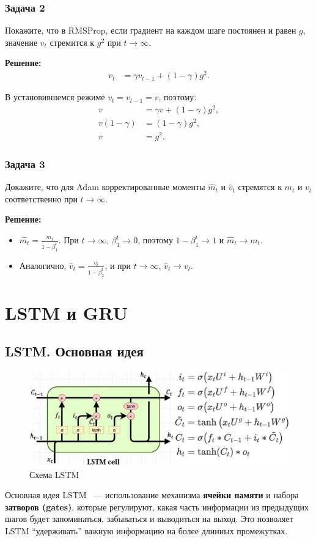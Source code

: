 \subsubsection*{Задача 2}
Покажите, что в RMSProp, если градиент на каждом шаге постоянен и равен $g$, значение $v_t$ стремится к $g^2$ при $t \to \infty$.

\textbf{Решение:}
\begin{align*}
    v_t &= \gamma v_{t-1} + (1 - \gamma) g^2.
\end{align*}

В установившемся режиме $v_t = v_{t-1} = v$, поэтому:
\begin{align*}
    v &= \gamma v + (1 - \gamma) g^2, \\
    v (1 - \gamma) &= (1 - \gamma) g^2, \\
    v &= g^2.
\end{align*}

\subsubsection*{Задача 3}
Докажите, что для Adam корректированные моменты $\hat{m}_t$ и $\hat{v}_t$ стремятся к $m_t$ и $v_t$ соответственно при $t \to \infty$.

\textbf{Решение:}
\begin{itemize}
    \item $\hat{m}_t = \frac{m_t}{1 - \beta_1^t}$. При $t \to \infty$, $\beta_1^t \to 0$, поэтому $1 - \beta_1^t \to 1$ и $\hat{m}_t \to m_t$.
    \item Аналогично, $\hat{v}_t = \frac{v_t}{1 - \beta_2^t}$, и при $t \to \infty$, $\hat{v}_t \to v_t$.
\end{itemize}

\section{LSTM и GRU}

\subsection{LSTM. Основная идея}

\begin{figure}[h]
	\centering
	\includegraphics[width=0.6\linewidth]{chapters/neural/images/lstm.png}
	\caption{Схема LSTM}
	\label{img:lstm}
\end{figure}
Основная идея LSTM~\cite{hochreiter1997long} --- использование механизма \textbf{ячейки памяти} и набора \textbf{затворов (gates)}, которые регулируют, какая часть информации из предыдущих шагов будет запоминаться, забываться и выводиться на выход. Это позволяет LSTM ``удерживать'' важную информацию на более длинных промежутках.

